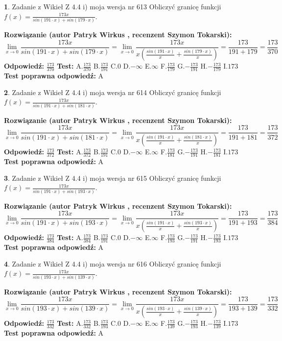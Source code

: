 \documentclass[12pt, a4paper]{article}
\theoremstyle{definition} %
\newtheorem{zad}{}
\newcommand{\zadStart}[1]{\begin{zad}#1\newline}
\newcommand{\zadStop}{\end{zad}}
\newcommand{\rozwStart}[2]{\noindent \textbf{Rozwiązanie (autor #1 , recenzent #2): }\newline}
\newcommand{\rozwStop}{\newline}
\newcommand{\odpStart}{\noindent \textbf{Odpowiedź:}\newline}
\newcommand{\odpStop}{\newline}
\newcommand{\testStart}{\noindent \textbf{Test:}\newline}
\newcommand{\testStop}{\newline}
\newcommand{\kluczStart}{\noindent \textbf{Test poprawna odpowiedź:}\newline}
\newcommand{\kluczStop}{\newline}
\begin{document}
\zadStart{Zadanie z Wikieł Z 4.4 i) moja wersja nr 613}
Obliczyć granicę funkcji $f(x)=\frac{173x}{sin(191\cdot x) +sin(179\cdot x)}$.
\zadStop
\rozwStart{Patryk Wirkus}{Szymon Tokarski}
$$\lim\limits_{x\to 0}\frac{173x}{sin(191\cdot x) +sin(179\cdot x)}=\lim\limits_{x\to 0}\frac{173x}{x(\frac{sin(191\cdot x)}{x}+\frac{sin(179\cdot x)}{x})}=\frac{173}{191+179} = \frac{173}{370}$$
\rozwStop
\odpStart
$\frac{173}{370}$
\odpStop
\testStart
A.$\frac{173}{370}$
B.$\frac{173}{191}$
C.$0$
D.$-\infty$
E.$\infty$
F.$\frac{173}{179}$
G.$-\frac{173}{191}$
H.$-\frac{173}{179}$
I.$173$
\testStop
\kluczStart
A
\kluczStop



\zadStart{Zadanie z Wikieł Z 4.4 i) moja wersja nr 614}
Obliczyć granicę funkcji $f(x)=\frac{173x}{sin(191\cdot x) +sin(181\cdot x)}$.
\zadStop
\rozwStart{Patryk Wirkus}{Szymon Tokarski}
$$\lim\limits_{x\to 0}\frac{173x}{sin(191\cdot x) +sin(181\cdot x)}=\lim\limits_{x\to 0}\frac{173x}{x(\frac{sin(191\cdot x)}{x}+\frac{sin(181\cdot x)}{x})}=\frac{173}{191+181} = \frac{173}{372}$$
\rozwStop
\odpStart
$\frac{173}{372}$
\odpStop
\testStart
A.$\frac{173}{372}$
B.$\frac{173}{191}$
C.$0$
D.$-\infty$
E.$\infty$
F.$\frac{173}{181}$
G.$-\frac{173}{191}$
H.$-\frac{173}{181}$
I.$173$
\testStop
\kluczStart
A
\kluczStop



\zadStart{Zadanie z Wikieł Z 4.4 i) moja wersja nr 615}
Obliczyć granicę funkcji $f(x)=\frac{173x}{sin(191\cdot x) +sin(193\cdot x)}$.
\zadStop
\rozwStart{Patryk Wirkus}{Szymon Tokarski}
$$\lim\limits_{x\to 0}\frac{173x}{sin(191\cdot x) +sin(193\cdot x)}=\lim\limits_{x\to 0}\frac{173x}{x(\frac{sin(191\cdot x)}{x}+\frac{sin(193\cdot x)}{x})}=\frac{173}{191+193} = \frac{173}{384}$$
\rozwStop
\odpStart
$\frac{173}{384}$
\odpStop
\testStart
A.$\frac{173}{384}$
B.$\frac{173}{191}$
C.$0$
D.$-\infty$
E.$\infty$
F.$\frac{173}{193}$
G.$-\frac{173}{191}$
H.$-\frac{173}{193}$
I.$173$
\testStop
\kluczStart
A
\kluczStop



\zadStart{Zadanie z Wikieł Z 4.4 i) moja wersja nr 616}
Obliczyć granicę funkcji $f(x)=\frac{173x}{sin(193\cdot x) +sin(139\cdot x)}$.
\zadStop
\rozwStart{Patryk Wirkus}{Szymon Tokarski}
$$\lim\limits_{x\to 0}\frac{173x}{sin(193\cdot x) +sin(139\cdot x)}=\lim\limits_{x\to 0}\frac{173x}{x(\frac{sin(193\cdot x)}{x}+\frac{sin(139\cdot x)}{x})}=\frac{173}{193+139} = \frac{173}{332}$$
\rozwStop
\odpStart
$\frac{173}{332}$
\odpStop
\testStart
A.$\frac{173}{332}$
B.$\frac{173}{193}$
C.$0$
D.$-\infty$
E.$\infty$
F.$\frac{173}{139}$
G.$-\frac{173}{193}$
H.$-\frac{173}{139}$
I.$173$
\testStop
\kluczStart
A
\kluczStop
\end{document}
